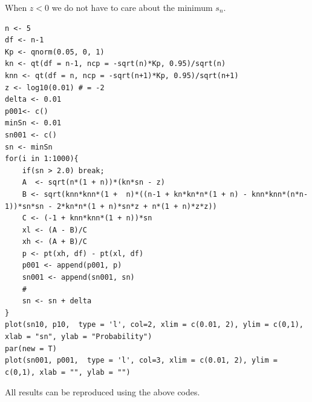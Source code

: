 \documentclass[10pt]{article}
\begin{document}
When $z < 0$ we do not have to care about the minimum $s_n$. 
\begin{lstlisting}[caption=Finding probabilities as a function of $s_n$, label=fuga2]
n <- 5
df <- n-1
Kp <- qnorm(0.05, 0, 1)
kn <- qt(df = n-1, ncp = -sqrt(n)*Kp, 0.95)/sqrt(n)
knn <- qt(df = n, ncp = -sqrt(n+1)*Kp, 0.95)/sqrt(n+1)
z <- log10(0.01) # = -2
delta <- 0.01
p001<- c()
minSn <- 0.01
sn001 <- c()
sn <- minSn
for(i in 1:1000){
	if(sn > 2.0) break;
	A  <- sqrt(n*(1 + n))*(kn*sn - z)
	B <- sqrt(knn*knn*(1 +  n)*((n-1 + kn*kn*n*(1 + n) - knn*knn*(n*n-1))*sn*sn - 2*kn*n*(1 + n)*sn*z + n*(1 + n)*z*z))
	C <- (-1 + knn*knn*(1 + n))*sn
	xl <- (A - B)/C
	xh <- (A + B)/C
	p <- pt(xh, df) - pt(xl, df)
	p001 <- append(p001, p)
	sn001 <- append(sn001, sn)
	#
	sn <- sn + delta
}
plot(sn10, p10,  type = 'l', col=2, xlim = c(0.01, 2), ylim = c(0,1), xlab = "sn", ylab = "Probability")
par(new = T)
plot(sn001, p001,  type = 'l', col=3, xlim = c(0.01, 2), ylim = c(0,1), xlab = "", ylab = "")
\end{lstlisting}

All results can be reproduced using the above codes.
\end{document}
